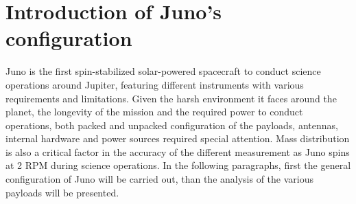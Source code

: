 \section{Introduction of Juno's configuration}
\label{sec:config_introduction}

Juno is the first spin-stabilized solar-powered spacecraft to conduct science operations around Jupiter, featuring different instruments with various requirements and limitations. Given the harsh environment it faces around the planet, the longevity of the mission and the required power to conduct operations, both packed and unpacked configuration of the payloads, antennas, internal hardware and power sources required special attention. Mass distribution is also a critical factor in the accuracy of the different measurement as Juno spins at 2 RPM during science operations. In the following paragraphs, first the general configuration of Juno will be carried out, than the analysis of the various payloads will be presented.